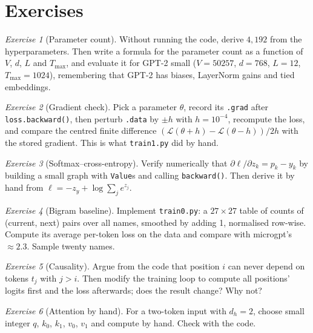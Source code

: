 \documentclass[11pt,letterpaper]{article}
\theoremstyle{remark}
\newtheorem{exercise}{Exercise}
\newcommand{\code}[1]{\lstinline[basicstyle=\ttfamily\small]|#1|}
\begin{document}
\section{Exercises}
\label{sec:exercises}

\begin{exercise}[Parameter count]
Without running the code, derive $4{,}192$ from the hyperparameters. Then write a formula for the parameter count as a function of $V$, $d$, $L$ and $T_{\max}$, and evaluate it for GPT-2 small ($V=50257$, $d=768$, $L=12$, $T_{\max}=1024$), remembering that GPT-2 has biases, LayerNorm gains and tied embeddings.
\end{exercise}

\begin{exercise}[Gradient check]
Pick a parameter $\theta$, record its \code{.grad} after \code{loss.backward()}, then perturb \code{.data} by $\pm h$ with $h=10^{-4}$, recompute the loss, and compare the centred finite difference $(\mathcal L(\theta+h)-\mathcal L(\theta-h))/2h$ with the stored gradient. This is what \texttt{train1.py} did by hand.
\end{exercise}

\begin{exercise}[Softmax--cross-entropy]
Verify numerically that $\partial\ell/\partial z_k = p_k - y_k$ by building a small graph with \code{Value}s and calling \code{backward()}. Then derive it by hand from $\ell = -z_y + \log\sum_j e^{z_j}$.
\end{exercise}

\begin{exercise}[Bigram baseline]
Implement \texttt{train0.py}: a $27\times 27$ table of counts of (current, next) pairs over all names, smoothed by adding 1, normalised row-wise. Compute its average per-token loss on the data and compare with microgpt's $\approx 2.3$. Sample twenty names.
\end{exercise}

\begin{exercise}[Causality]
Argue from the code that position $i$ can never depend on tokens $t_j$ with $j>i$. Then modify the training loop to compute all positions' logits first and the loss afterwards; does the result change? Why not?
\end{exercise}

\begin{exercise}[Attention by hand]
For a two-token input with $d_h=2$, choose small integer $q$, $k_0$, $k_1$, $v_0$, $v_1$ and compute  by hand. Check with the code.
\end{exercise}
\end{document}
